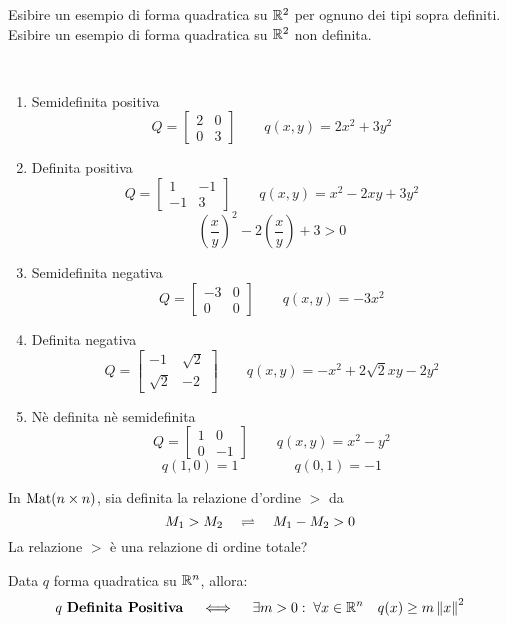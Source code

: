 \begin{appendices}
\begin{definition}
\begin{note}
	\end{note}
\end{definition}
\begin{exercise}
	Esibire un esempio di forma quadratica su $\mathbb{R}^2$ per ognuno dei tipi sopra definiti.\\
	Esibire un esempio di forma quadratica su $\mathbb{R}^2$ non definita.
	\begin{solution}~
		\begin{enumerate}
			\item Semidefinita positiva
				\[ Q =
					\begin{bmatrix}
						2 & 0\\
						0 & 3
					\end{bmatrix}
					\qquad
					q(x,y) = 2x^2 + 3y^2
				\]
			\item Definita positiva
				\[ Q =
					\begin{bmatrix}
						1 & -1\\
						-1 & 3
					\end{bmatrix}
					\qquad
					q(x,y) = x^2 - 2xy + 3y^2
				\]
				\[\left( \frac{x}{y} \right)^2 - 2\left( \frac{x}{y} \right) + 3 > 0\]
			\item Semidefinita negativa
				\[ Q =
					\begin{bmatrix}
						-3 & 0\\
						0 & 0
					\end{bmatrix}
					\qquad
					q(x,y) = -3x^2
				\]
			\item Definita negativa
				\[ Q =
					\begin{bmatrix}
						-1 & \sqrt{2}\\
						\sqrt{2} & -2
					\end{bmatrix}
					\qquad
					q(x,y) = -x^2 + 2\sqrt{2}xy - 2y^2
				\]
			\item Nè definita nè semidefinita
				\[ Q =
					\begin{bmatrix}
						1 & 0\\
						0 & -1
					\end{bmatrix}
					\qquad
					q(x,y) = x^2 - y^2
				\]
				\[q(1,0) = 1 \qquad\qquad q(0,1) = -1\]
		\end{enumerate}
	\end{solution}
\end{exercise}
\begin{exercise}
	In $\operatorname{Mat} (n \times n)$, sia definita la relazione d'ordine $>$ da
	\[M_1 > M_2 \quad \rightleftharpoons \quad M_1 - M_2 > 0\]
	La relazione $>$ è una relazione di ordine totale?
\end{exercise}
\begin{proposition}
	\label{prop:form_quadr_def_pos_q_geq_m}
	Data $q$ forma quadratica su $\mathbb{R}^n$, allora:
	\[
		q \text{ \textbf{Definita Positiva}} \quad \iff \quad \exists m > 0:\; \forall x \in \mathbb{R}^n \quad q(x) \geq m \left\|x\right\|^2
	\]


\end{proposition}
\end{appendices}
